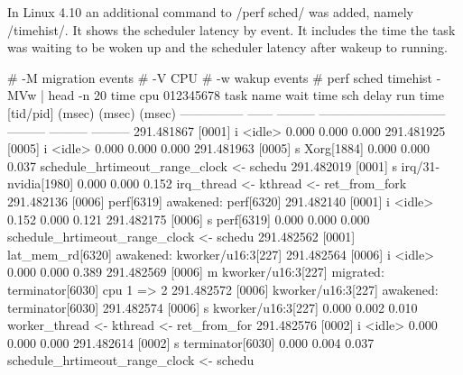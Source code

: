 In Linux 4.10 an additional command to /perf sched/ was added, namely
/timehist/. It shows the scheduler latency by event. It includes the
time the task was waiting to be woken up and the scheduler latency
after wakeup to running.

\starttyping
# -M migration events
# -V CPU
# -w wakup events
# perf sched timehist -MVw | head -n 20
           time    cpu  012345678  task name                       wait time  sch delay   run time
                                   [tid/pid]                          (msec)     (msec)     (msec)
--------------- ------  ---------  ------------------------------  ---------  ---------  ---------
     291.481867 [0001]   i         <idle>                              0.000      0.000      0.000
     291.481925 [0005]       i     <idle>                              0.000      0.000      0.000
     291.481963 [0005]       s     Xorg[1884]                          0.000      0.000      0.037                                    schedule_hrtimeout_range_clock <- schedu
     291.482019 [0001]   s         irq/31-nvidia[1980]                 0.000      0.000      0.152                                    irq_thread <- kthread <- ret_from_fork
     291.482136 [0006]             perf[6319]                                                       awakened: perf[6320]
     291.482140 [0001]   i         <idle>                              0.152      0.000      0.121
     291.482175 [0006]        s    perf[6319]                          0.000      0.000      0.000                                    schedule_hrtimeout_range_clock <- schedu
     291.482562 [0001]             lat_mem_rd[6320]                                                 awakened: kworker/u16:3[227]
     291.482564 [0006]        i    <idle>                              0.000      0.000      0.389
     291.482569 [0006]         m     kworker/u16:3[227]                                               migrated: terminator[6030] cpu 1 => 2
     291.482572 [0006]             kworker/u16:3[227]                                               awakened: terminator[6030]
     291.482574 [0006]        s    kworker/u16:3[227]                  0.000      0.002      0.010                                    worker_thread <- kthread <- ret_from_for
     291.482576 [0002]    i        <idle>                              0.000      0.000      0.000
     291.482614 [0002]    s        terminator[6030]                    0.000      0.004      0.037                                    schedule_hrtimeout_range_clock <- schedu
\stoptyping

